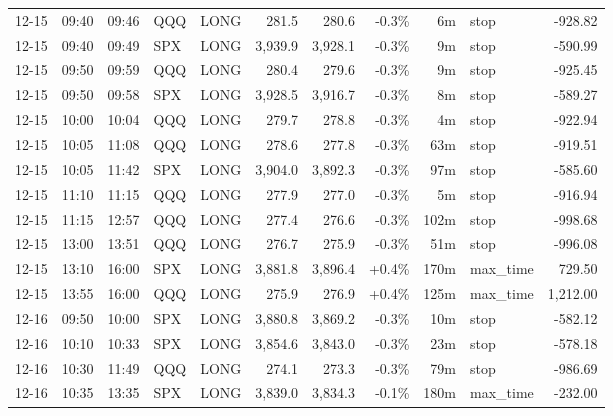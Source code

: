 \documentclass[11pt,a4paper,twoside]{article}
\begin{document}
\begin{center}
\begin{longtable}{>{\color{txtmain}}l l l l l r r r r >{\color{txtmain}}l r}
12-15 & 09:40 & 09:46 & QQQ & LONG & 281.5 & 280.6 & \textcolor{lossred}{-0.3\%} & 6m & stop & \textcolor{lossred}{-928.82} \\
12-15 & 09:40 & 09:49 & SPX & LONG & 3,939.9 & 3,928.1 & \textcolor{lossred}{-0.3\%} & 9m & stop & \textcolor{lossred}{-590.99} \\
12-15 & 09:50 & 09:59 & QQQ & LONG & 280.4 & 279.6 & \textcolor{lossred}{-0.3\%} & 9m & stop & \textcolor{lossred}{-925.45} \\
12-15 & 09:50 & 09:58 & SPX & LONG & 3,928.5 & 3,916.7 & \textcolor{lossred}{-0.3\%} & 8m & stop & \textcolor{lossred}{-589.27} \\
12-15 & 10:00 & 10:04 & QQQ & LONG & 279.7 & 278.8 & \textcolor{lossred}{-0.3\%} & 4m & stop & \textcolor{lossred}{-922.94} \\
12-15 & 10:05 & 11:08 & QQQ & LONG & 278.6 & 277.8 & \textcolor{lossred}{-0.3\%} & 63m & stop & \textcolor{lossred}{-919.51} \\
12-15 & 10:05 & 11:42 & SPX & LONG & 3,904.0 & 3,892.3 & \textcolor{lossred}{-0.3\%} & 97m & stop & \textcolor{lossred}{-585.60} \\
12-15 & 11:10 & 11:15 & QQQ & LONG & 277.9 & 277.0 & \textcolor{lossred}{-0.3\%} & 5m & stop & \textcolor{lossred}{-916.94} \\
12-15 & 11:15 & 12:57 & QQQ & LONG & 277.4 & 276.6 & \textcolor{lossred}{-0.3\%} & 102m & stop & \textcolor{lossred}{-998.68} \\
12-15 & 13:00 & 13:51 & QQQ & LONG & 276.7 & 275.9 & \textcolor{lossred}{-0.3\%} & 51m & stop & \textcolor{lossred}{-996.08} \\
12-15 & 13:10 & 16:00 & SPX & LONG & 3,881.8 & 3,896.4 & \textcolor{wingreen}{+0.4\%} & 170m & max\_time & \textcolor{wingreen}{729.50} \\
12-15 & 13:55 & 16:00 & QQQ & LONG & 275.9 & 276.9 & \textcolor{wingreen}{+0.4\%} & 125m & max\_time & \textcolor{wingreen}{1,212.00} \\
12-16 & 09:50 & 10:00 & SPX & LONG & 3,880.8 & 3,869.2 & \textcolor{lossred}{-0.3\%} & 10m & stop & \textcolor{lossred}{-582.12} \\
12-16 & 10:10 & 10:33 & SPX & LONG & 3,854.6 & 3,843.0 & \textcolor{lossred}{-0.3\%} & 23m & stop & \textcolor{lossred}{-578.18} \\
12-16 & 10:30 & 11:49 & QQQ & LONG & 274.1 & 273.3 & \textcolor{lossred}{-0.3\%} & 79m & stop & \textcolor{lossred}{-986.69} \\
12-16 & 10:35 & 13:35 & SPX & LONG & 3,839.0 & 3,834.3 & \textcolor{lossred}{-0.1\%} & 180m & max\_time & \textcolor{lossred}{-232.00} \\

\end{longtable}
\end{center}
\end{document}
